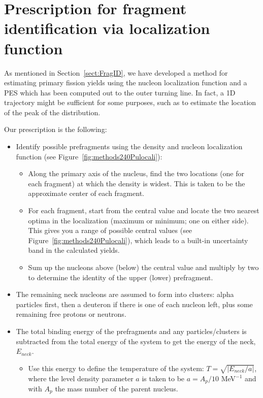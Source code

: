 \chapter{Prescription for fragment identification via localization function}\label{append:Fragments}
As mentioned in Section~\ref{sect:FragID}, we have developed a method for estimating primary fission yields using the nucleon localization function and a PES which has been computed out to the outer turning line. In fact, a 1D trajectory might be sufficient for some purposes, such as to estimate the location of the peak of the distribution.

Our prescription is the following:

\begin{itemize}
	\item Identify possible prefragments using the density and nucleon localization function (see Figure~\ref{fig:methods240Pulocali}):
	\begin{itemize}
		\item Along the primary axis of the nucleus, find the two locations (one for each fragment) at which the density is widest. This is taken to be the approximate center of each fragment.
		\item For each fragment, start from the central value and locate the two nearest optima in the localization (maximum or minimum; one on either side). This gives you a range of possible central values (see Figure~\ref{fig:methods240Pulocali}), which leads to a built-in uncertainty band in the calculated yields.
		\item Sum up the nucleons above (below) the central value and multiply by two to determine the identity of the upper (lower) prefragment.
	\end{itemize}
	\item The remaining neck nucleons are assumed to form into clusters: alpha particles first, then a deuteron if there is one of each nucleon left, plus some remaining free protons or neutrons.
	\item The total binding energy of the prefragments and any particles/clusters is subtracted from the total energy of the system to get the energy of the neck, $E_{neck}$.
	\begin{itemize}
		\item Use this energy to define the temperature of the system: $T = \sqrt{\left|E_{neck}/a\right|}$, where the level density parameter $a$ is taken to be $a=A_p/10$ MeV$^{-1}$ and with $A_p$ the mass number of the parent nucleus.
	\end{itemize}

\end{itemize}
